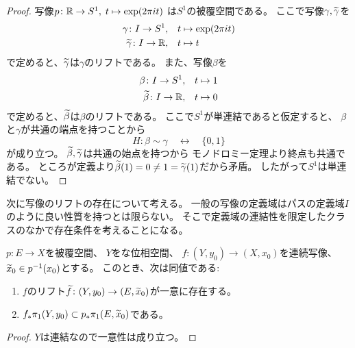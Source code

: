 \documentclass[report]{jlreq}
\begin{document}
\begin{proof}
    写像$p \colon \mathbb{R} \to S^1, \;
        t \mapsto \exp(2\pi i t)$
    は$S^1$の被覆空間である。
    ここで写像$\gamma, \widetilde{\gamma}$を
    \begin{alignat}{1}
        \gamma \colon I \to S^1, \quad & t \mapsto \exp(2\pi i t) \\
        \widetilde{\gamma} \colon I \to \mathbb{R}, \quad & t \mapsto t
    \end{alignat}
    で定めると、$\widetilde{\gamma}$は$\gamma$のリフトである。
    また、写像$\beta$を
    \begin{alignat}{1}
        \beta \colon I \to S^1, \quad & t \mapsto 1 \\
        \widetilde{\beta} \colon I \to \mathbb{R}, \quad & t \mapsto 0
    \end{alignat}
    で定めると、$\widetilde{\beta}$は$\beta$のリフトである。
    ここで$S^1$が単連結であると仮定すると、
    $\beta$と$\gamma$が共通の端点を持つことから
    \begin{equation}
        H \colon \beta \sim \gamma \quad \rel \quad \{ 0, 1 \}
    \end{equation}
    が成り立つ。
    $\widetilde{\beta}, \widetilde{\gamma}$は共通の始点を持つから
    モノドロミー定理より終点も共通である。
    ところが定義より$\widetilde{\beta}(1) = 0 \neq 1 = \widetilde{\gamma}(1)$だから矛盾。
    したがって$S^1$は単連結でない。
\end{proof}

次に写像のリフトの存在について考える。
一般の写像の定義域はパスの定義域$I$のように良い性質を持つとは限らない。
そこで定義域の連結性を限定したクラスのなかで存在条件を考えることになる。

\begin{theorem}[リフトの存在条件]
    $p \colon E \to X$を被覆空間、
    $Y$をな位相空間、
    $f \colon (Y, y_0) \to (X, x_0)$を連続写像、
    $\widetilde{x}_0 \in p^{-1}(x_0)$とする。
    このとき、次は同値である:
    \begin{enumerate}
        \item $f$のリフト$\widetilde{f} \colon (Y, y_0) \to (E, \widetilde{x}_0)$が一意に存在する。
        \item $f_* \pi_1(Y, y_0) \subset p_* \pi_1(E, \widetilde{x}_0)$である。
    \end{enumerate}
\end{theorem}

\begin{proof}
    $Y$は連結なので一意性は成り立つ。

    \TODO{}
\end{proof}
\end{document}
